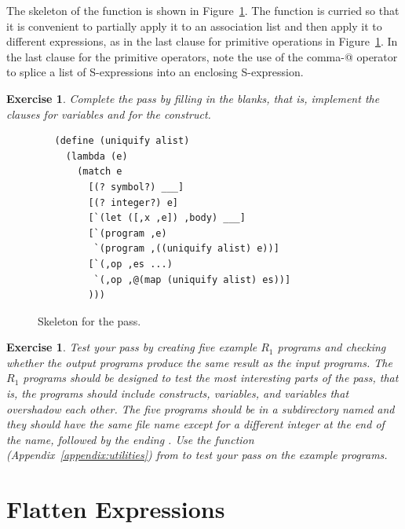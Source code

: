 \documentclass[11pt]{book}
\newtheorem{exercise}[theorem]{Exercise}
\begin{document}
The skeleton of the  function is shown in
Figure~\ref{fig:uniquify-s0}.  The function is curried so that it is
convenient to partially apply it to an association list and then apply
it to different expressions, as in the last clause for primitive
operations in Figure~\ref{fig:uniquify-s0}. In the last 
clause for the primitive operators, note the use of the comma-@
operator to splice a list of S-expressions into an enclosing
S-expression.

\begin{exercise}
\normalfont %

Complete the  pass by filling in the blanks, that is,
implement the clauses for variables and for the  construct.
\end{exercise}

\begin{figure}[tbp]
\begin{lstlisting}
   (define (uniquify alist)
     (lambda (e)
       (match e
         [(? symbol?) ___]
         [(? integer?) e]
         [`(let ([,x ,e]) ,body) ___]
         [`(program ,e)
          `(program ,((uniquify alist) e))]
         [`(,op ,es ...)
          `(,op ,@(map (uniquify alist) es))]
         )))
\end{lstlisting}
\caption{Skeleton for the  pass.}
\label{fig:uniquify-s0}
\end{figure}

\begin{exercise}
\normalfont %

Test your  pass by creating five example $R_1$ programs
and checking whether the output programs produce the same result as
the input programs. The $R_1$ programs should be designed to test the
most interesting parts of the  pass, that is, the
programs should include  constructs, variables, and variables
that overshadow each other.  The five programs should be in a
subdirectory named  and they should have the same file name
except for a different integer at the end of the name, followed by the
ending .  Use the  function
(Appendix~\ref{appendix:utilities}) from  to test
your  pass on the example programs.

\end{exercise}


\section{Flatten Expressions}
\label{sec:flatten-r1}
\end{document}
